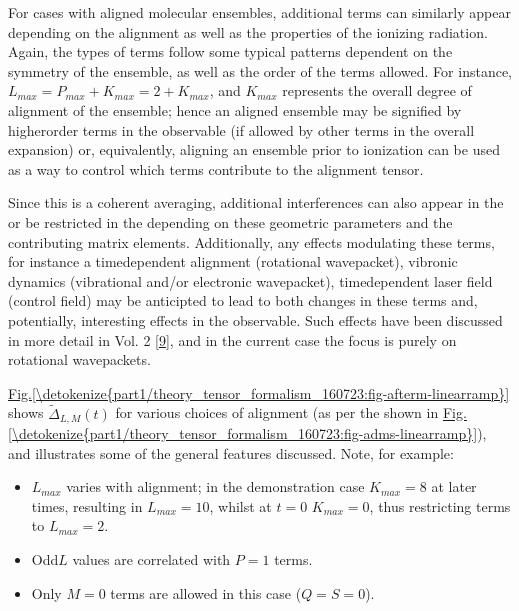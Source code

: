 \documentclass[letterpaper,table,10pt,english]{jupyterBook}
\begin{document}
\sphinxAtStartPar
For cases with aligned molecular ensembles, additional terms can similarly appear depending on the alignment as well as the properties of the ionizing radiation. Again, the types of terms follow some typical patterns dependent on the symmetry of the ensemble, as well as the order of the terms allowed. For instance, \(L_{max}=P_{max}+K_{max}=2+K_{max}\), and \(K_{max}\) represents the overall degree of alignment of the ensemble; hence an aligned ensemble may be signified by higher\sphinxhyphen{}order terms in the observable (if allowed by other terms in the overall expansion) or, equivalently, aligning an ensemble prior to ionization can be used as a way to control which terms contribute to the alignment tensor.

\sphinxAtStartPar
Since this is a coherent averaging, additional interferences can also appear in the {\hyperref[\detokenize{backmatter/glossary:term-AF}]{}} \sphinxhyphen{} or be restricted in the {\hyperref[\detokenize{backmatter/glossary:term-AF}]{}} \sphinxhyphen{} depending on these geometric parameters and the contributing matrix elements. Additionally, any effects modulating these terms, for instance a time\sphinxhyphen{}dependent alignment (rotational wavepacket), vibronic dynamics (vibrational and/or electronic wavepacket), time\sphinxhyphen{}dependent laser field (control field) may be anticipted to lead to both changes in these terms and, potentially, interesting effects in the observable. Such effects have been discussed in more detail in  Vol. 2 {[}\hyperlink{cite.backmatter/bibliography:id677}{9}{]}, and in the current case the focus is purely on rotational wavepackets.

\sphinxAtStartPar
\hyperref[\detokenize{part1/theory_tensor_formalism_160723:fig-afterm-linearramp}]{Fig.\@ \ref{\detokenize{part1/theory_tensor_formalism_160723:fig-afterm-linearramp}}} shows \(\tilde{\Delta}_{L,M}(t)\) for various choices of alignment (as per the {\hyperref[\detokenize{backmatter/glossary:term-ADMs}]{}} shown in \hyperref[\detokenize{part1/theory_tensor_formalism_160723:fig-adms-linearramp}]{Fig.\@ \ref{\detokenize{part1/theory_tensor_formalism_160723:fig-adms-linearramp}}}), and illustrates some of the general features discussed. Note, for example:
\begin{itemize}
\item {} 
\sphinxAtStartPar
\(L_{max}\) varies with alignment; in the demonstration case \(K_{max}=8\) at later times, resulting in \(L_{max}=10\), whilst at \(t=0\) \(K_{max}=0\), thus restricting terms to \(L_{max}=2\).

\item {} 
\sphinxAtStartPar
Odd\sphinxhyphen{}\(L\) values are correlated with \(P=1\) terms.

\item {} 
\sphinxAtStartPar
Only \(M=0\) terms are allowed in this case (\(Q=S=0\)).

\end{itemize}
\end{document}
